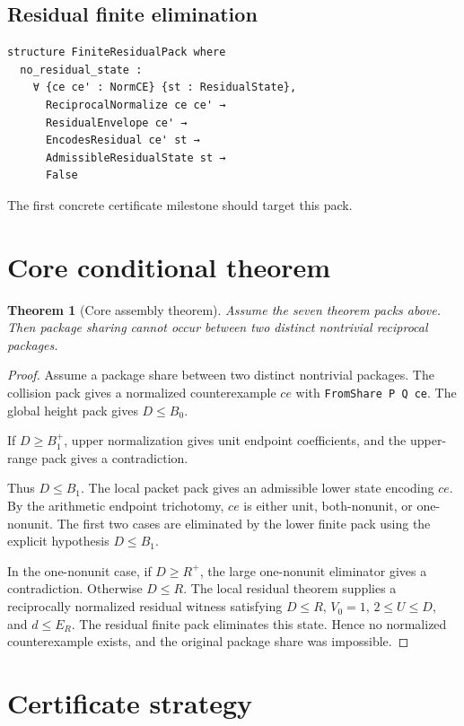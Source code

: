 \documentclass[11pt]{article}
\newtheorem{theorem}{Theorem}
\begin{document}
\subsection{Residual finite elimination}

\begin{lstlisting}[language={}]
structure FiniteResidualPack where
  no_residual_state :
    ∀ {ce ce' : NormCE} {st : ResidualState},
      ReciprocalNormalize ce ce' →
      ResidualEnvelope ce' →
      EncodesResidual ce' st →
      AdmissibleResidualState st →
      False
\end{lstlisting}
The first concrete certificate milestone should target this pack.

\section{Core conditional theorem}

\begin{theorem}[Core assembly theorem]
Assume the seven theorem packs above.  Then package sharing cannot occur
between two distinct nontrivial reciprocal packages.
\end{theorem}

\begin{proof}
Assume a package share between two distinct nontrivial packages.  The collision
pack gives a normalized counterexample $ce$ with \verb|FromShare P Q ce|.  The
global height pack gives $D\leq B_0$.

If $D\geq B_1^+$, upper normalization gives unit endpoint coefficients, and the
upper-range pack gives a contradiction.

Thus $D\leq B_1$.  The local packet pack gives an admissible lower state
encoding $ce$.  By the arithmetic endpoint trichotomy, $ce$ is either unit,
both-nonunit, or one-nonunit.  The first two cases are eliminated by the lower
finite pack using the explicit hypothesis $D\leq B_1$.

In the one-nonunit case, if $D\geq R^+$, the large one-nonunit eliminator gives
a contradiction.  Otherwise $D\leq R$.  The local residual theorem supplies a
reciprocally normalized residual witness satisfying
$D\leq R$, $V_0=1$, $2\leq U\leq D$, and $d\leq E_R$.  The residual finite pack
eliminates this state.  Hence no normalized counterexample exists, and the
original package share was impossible.
\end{proof}

\section{Certificate strategy}
\end{document}
